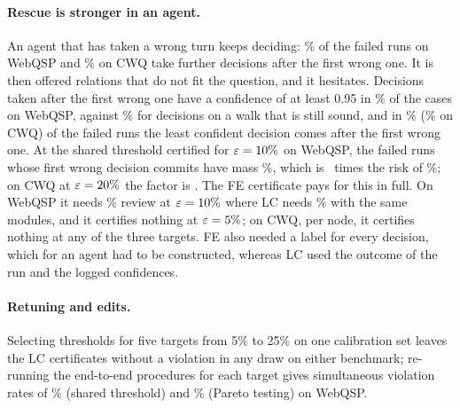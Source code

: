 \paragraph{Rescue is stronger in an agent.} An agent that has taken a wrong turn keeps
deciding: \AgentGoesOnW\% of the failed runs on WebQSP and \AgentGoesOnQ\% on CWQ take
further decisions after the first wrong one. It is then offered relations that do not fit
the question, and it hesitates. Decisions taken after the first wrong one have a confidence
of at least 0.95 in \AgentConfidentAfterW\% of the cases on WebQSP, against
\AgentConfidentSoundW\% for decisions on a walk that is still sound, and in
\AgentLeastLaterW\% (\AgentLeastLaterQ\% on CWQ) of the failed runs the least confident
decision comes after the first wrong one. At the shared threshold certified for $\varepsilon=10\%$ on WebQSP, the failed
runs whose first wrong decision commits have mass \FdMassWTen\%, which is \FdRatioWTen\ times
the risk of \RiskWSharedTen\%; on CWQ at $\varepsilon=20\%$ the factor is \FdRatioQTwenty. The FE
certificate pays for this in full. On WebQSP it needs \RevWFEnodeTen\% review at
$\varepsilon=10\%$ where LC needs \RevWLCnodeTen\% with the same modules, and it certifies nothing at
$\varepsilon=5\%$; on CWQ, per node, it certifies nothing at any of the three targets. FE also needed a label
for every decision, which for an agent had to be constructed, whereas LC used the outcome of
the run and the logged confidences.

\paragraph{Retuning and edits.} Selecting thresholds for five targets from 5\% to 25\% on one
calibration set leaves the LC certificates without a violation in any draw on either
benchmark; re-running the end-to-end procedures for each target gives simultaneous violation
rates of \AnyViolWShared\% (shared threshold) and \AnyViolWPareto\% (Pareto testing) on WebQSP.

